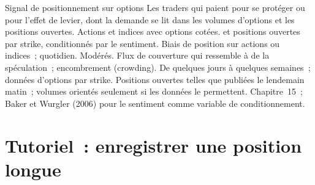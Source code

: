 \begin{strategyfile}{Signal de positionnement sur options}\label{strat:s1:positioning-and-sentiment:options}
 Les traders qui paient pour se protéger ou pour l'effet de levier, dont la demande se lit dans les volumes d'options et les positions ouvertes.
 Actions et indices avec options cotées.
  et positions ouvertes par strike, conditionnés par le sentiment.
 Biais de position sur actions ou indices~; quotidien.
 Modérés.
 Flux de couverture qui ressemble à de la spéculation~; encombrement (crowding).
 De quelques jours à quelques semaines~; données d'options par strike.
 Positions ouvertes telles que publiées le lendemain matin~; volumes orientés seulement si les données le permettent.
 Chapitre~15~; Baker et Wurgler (2006) pour le sentiment comme variable de conditionnement.
\end{strategyfile}

\section{Tutoriel~: enregistrer une position longue}\label{tut:s1:positioning-and-sentiment:tut}

